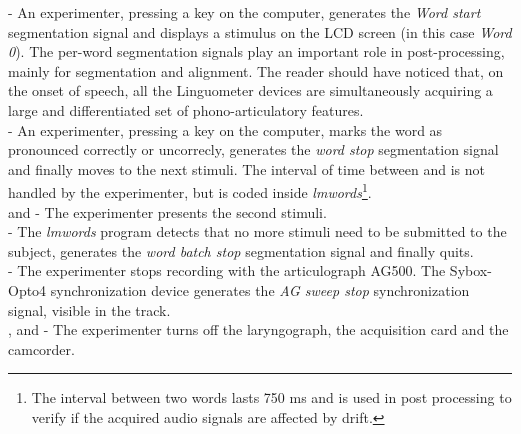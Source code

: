  - An experimenter, pressing a key on the  computer, 
generates the  \emph{Word start} segmentation signal and displays a stimulus
on the LCD screen (in this case \emph{Word 0}).
The per-word segmentation signals play an important role in post-processing,
mainly for segmentation and alignment.
The reader should have noticed that, on the onset of speech, all the Linguometer
devices are simultaneously acquiring a large and differentiated set of 
phono-articulatory features.\\

 - An experimenter, pressing a key on the  computer, 
marks the word as pronounced correctly or uncorrecly, generates the
\emph{word stop}
segmentation signal and finally moves to the next stimuli.
The interval of time between  and  is not handled
by the experimenter, but is coded inside
\emph{lmwords}\footnote{The interval between two words lasts 750 ms and is
used in post processing to verify if the acquired audio signals are affected by 
drift.}.\\

 and  - The experimenter presents the second 
stimuli.\\

 - The \emph{lmwords} program detects that no more stimuli need to be 
submitted to the subject, generates the \emph{word batch stop} segmentation
signal
and finally quits.\\

 - The experimenter stops recording with the articulograph AG500. 
The Sybox-Opto4 synchronization device generates the \emph{AG sweep stop}
synchronization signal, visible in the  track.\\

,  and  - The experimenter turns off the
laryngograph,
the acquisition card and the
camcorder.\\

